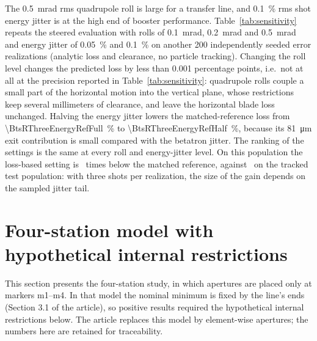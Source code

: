 \documentclass[10pt,a4paper]{article}
\begin{document}
\begin{table}[htbp]\centering
\caption{Sensitivity of the steered matched line (Matched denotes the matched reference) to the roll and energy-jitter levels: mean
predicted loss and mean minimum five-sigma clearance on 200 error realizations with three shots
each (analytic, not tracked). Each row holds for all three roll levels, whose results are
identical at the printed precision.}\label{tab:sensitivity}
{\small}\end{table}

The \SI{0.5}{\milli\radian} rms quadrupole roll is large for a transfer line, and \SI{0.1}{\percent} rms shot
energy jitter is at the high end of booster performance. Table~\ref{tab:sensitivity}
repeats the steered evaluation with rolls of \SI{0.1}{\milli\radian}, \SI{0.2}{\milli\radian} and \SI{0.5}{\milli\radian} and energy jitter
of \SI{0.05}{\percent} and \SI{0.1}{\percent} on another 200 independently seeded error realizations
(analytic loss and clearance, no particle tracking). Changing the roll level changes
the predicted loss by less than 0.001 percentage points, i.e.\ not at all at the
precision reported in Table~\ref{tab:sensitivity}: quadrupole rolls couple a small part of the
horizontal motion into the vertical plane, whose restrictions keep several
millimeters of clearance, and leave the horizontal blade loss unchanged. Halving the
energy jitter lowers the matched-reference loss from \SI{\BtsRThreeEnergyRefFull}{\percent} to
\SI{\BtsRThreeEnergyRefHalf}{\percent}, because its \SI{81}{\micro\metre} exit contribution is small
compared with the betatron jitter. The ranking of the settings is the same at every
roll and energy-jitter level. On this population the loss-based setting is \BtsRThreeSensRatio\ times below
the matched reference, against \BtsRThreeLossRatio\ on the tracked test population: with
three shots per realization, the size of the gain depends on the sampled jitter tail.

\section{Four-station model with hypothetical internal restrictions}
This section presents the four-station study, in which apertures are placed
only at markers m1--m4. In that model the nominal minimum is fixed by the line's
ends (Section 3.1 of the article), so positive results required the hypothetical
internal restrictions below. The article replaces this model by element-wise
apertures; the numbers here are retained for traceability.
\end{document}
